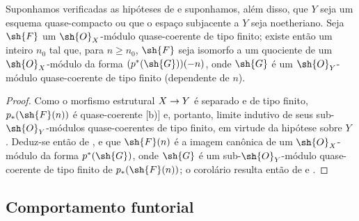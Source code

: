 \documentclass[oneside,10pt]{amsart}
\makeatletter
\renewcommand{\geq}{\geqslant}
\newcommand{\ega@arrow}[2]{\mathchoice{#1}{#2}{#2}{#2}}
\renewcommand{\to}{\ega@arrow{\longrightarrow}{\rightarrow}}
\let\EGAOriginalLabel\label
\renewcommand{\label}[1]{\phantomsection\EGAOriginalLabel{#1}}
\makeatother
\begin{document}
\begin{corollary}[3.4.8]
\label{II.3.4.8}
Suponhamos verificadas as hipóteses de  e suponhamos, além disso, que $Y$ seja um esquema quase-compacto ou que o espaço subjacente a $Y$ seja noetheriano.
Seja $\sh{F}$ um $\sh{O}_X$-módulo quase-coerente de tipo finito;
existe então um inteiro $n_0$ tal que, para $n\geq n_0$, $\sh{F}$ seja isomorfo a um quociente de um $\sh{O}_X$-módulo da forma $(p^*(\sh{G}))(-n)$, onde $\sh{G}$ é um $\sh{O}_Y$-módulo quase-coerente de tipo finito (dependente de $n$).
\end{corollary}

\begin{proof}
Como o morfismo estrutural $X\to Y$ é separado e de tipo finito, $p_*(\sh{F}(n))$ é quase-coerente [b)] e, portanto, limite indutivo de seus sub-$\sh{O}_Y$-módulos quase-coerentes de tipo finito, em virtude da hipótese sobre $Y$ .
Deduz-se então de ,  e  que $\sh{F}(n)$ é a imagem canônica de um $\sh{O}_X$-módulo da forma $p^*(\sh{G})$, onde $\sh{G}$ é um sub-$\sh{O}_Y$-módulo quase-coerente de tipo finito de $p_*(\sh{F}(n))$;
o corolário resulta então de  e .
\end{proof}

\subsection{Comportamento funtorial}
\label{subsection:II.3.5}
\end{document}
